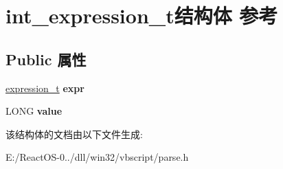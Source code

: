 \hypertarget{structint__expression__t}{}\section{int\+\_\+expression\+\_\+t结构体 参考}
\label{structint__expression__t}
\subsection*{Public 属性}
\begin{DoxyCompactItemize}
\item 
\mbox{\label{structint__expression__t_aba3287010b489bab853709eed2f9b4e7}} 
\hyperlink{struct__expression__t}{expression\+\_\+t} {\bfseries expr}
\item 
\mbox{\label{structint__expression__t_a3c9365b23e2eed502272d6bf133d4491}} 
L\+O\+NG {\bfseries value}
\end{DoxyCompactItemize}


该结构体的文档由以下文件生成\+:\begin{DoxyCompactItemize}
\item 
E\+:/\+React\+O\+S-\/0../dll/win32/vbscript/parse.\+h\end{DoxyCompactItemize}
